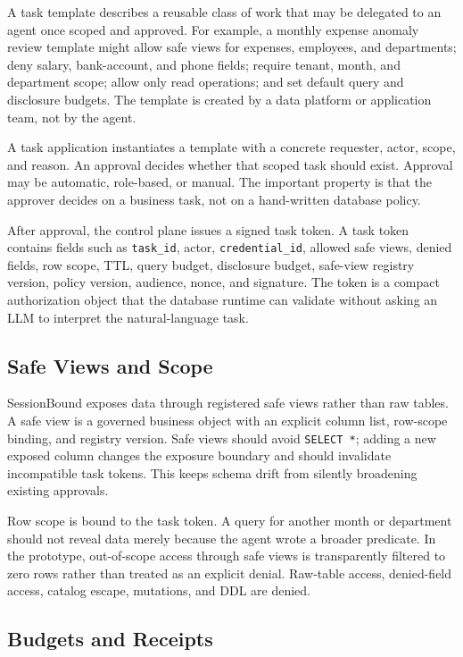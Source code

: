 \documentclass[10pt,twocolumn]{article}
\begin{document}
A task template describes a reusable class of work that may be delegated
to an agent once scoped and approved. For example, a monthly expense
anomaly review template might allow safe views for expenses, employees,
and departments; deny salary, bank-account, and phone fields; require
tenant, month, and department scope; allow only read operations; and set
default query and disclosure budgets. The template is created by a data
platform or application team, not by the agent.

A task application instantiates a template with a concrete requester,
actor, scope, and reason. An approval decides whether that scoped task
should exist. Approval may be automatic, role-based, or manual. The
important property is that the approver decides on a business task, not
on a hand-written database policy.

After approval, the control plane issues a signed task token. A task
token contains fields such as \texttt{task\_id}, actor,
\texttt{credential\_id}, allowed safe views, denied fields, row scope,
TTL, query budget, disclosure budget, safe-view registry version,
policy version, audience, nonce, and signature. The token is a compact
authorization object that the database runtime can validate without
asking an LLM to interpret the natural-language task.

\subsection{Safe Views and Scope}

SessionBound exposes data through registered safe views rather than raw
tables. A safe view is a governed business object with an explicit
column list, row-scope binding, and registry version. Safe views should
avoid \texttt{SELECT *}; adding a new exposed column changes the
exposure boundary and should invalidate incompatible task tokens. This
keeps schema drift from silently broadening existing approvals.

Row scope is bound to the task token. A query for another month or
department should not reveal data merely because the agent wrote a
broader predicate. In the prototype, out-of-scope access through safe
views is transparently filtered to zero rows rather than treated as an
explicit denial. Raw-table access, denied-field access, catalog escape,
mutations, and DDL are denied.

\subsection{Budgets and Receipts}
\end{document}
